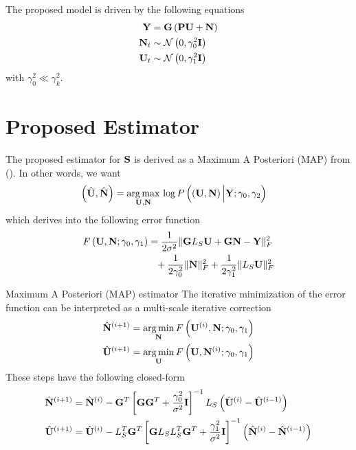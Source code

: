 The proposed model is driven by the following equations
\begin{align}
    \mathbf{Y} &= \mathbf{G} \left( \mathbf{P} \mathbf{U} + \mathbf{N} \right) \\
    \mathbf{N}_t &\sim  
    \mathcal{N}\left( 0, \gamma_0^2 \mathbf{I}  \right) \\
    \mathbf{U}_t &\sim  
    \mathcal{N}\left( 0, \gamma_1^2 \mathbf{I}  \right) 
\end{align}
with $\gamma_0^2 \ll \gamma_k^2$.

\section{Proposed Estimator}

The proposed estimator for $\mathbf{S}$ is derived as a Maximum A Posteriori (MAP) from ().
%
In other words, we want
\begin{align}
    \left(  \hat{\mathbf{U}}, \hat{\mathbf{N}}  \right) &=
    \operatorname*{arg\,max}_{\mathbf{U}, \mathbf{N} }\,
    \log P\left( \left(  {\mathbf{U}}, {\mathbf{N}}  \right) \Big| {\mathbf{Y}; \gamma_0, \gamma_2}  \right)
\end{align}
which derives into the following error function
\begin{align}
    F\left(  {\mathbf{U}}, {\mathbf{N}};  \gamma_0, \gamma_1 \right) &=
    \frac{1}{2\sigma^2}
    \lVert \mathbf{G} L_S \mathbf{U} + \mathbf{G} \mathbf{N} - \mathbf{Y} \rVert_F^2
    \nonumber \\
    &\phantom{=}
    +
    \frac{1}{2\gamma_0^2} \lVert \mathbf{N} \rVert_F^2
    +
    \frac{1}{2\gamma_1^2} \lVert L_S \mathbf{U} \rVert_F^2
\end{align}
 


 {Maximum A Posteriori (MAP) estimator}
    The iterative minimization of the error function can be interpreted as a multi-scale iterative correction
    \begin{align}
        \hat{\mathbf{N}}^{(i+1)} &= \operatorname*{arg\,min}_{\mathbf{N}} F\left( \mathbf{U}^{(i)},\mathbf{N}; \gamma_0, \gamma_1 \right)
        \\
        \hat{\mathbf{U}}^{(i+1)} &= \operatorname*{arg\,min}_{\mathbf{U}} F\left( \mathbf{U},\mathbf{N}^{(i)}; \gamma_0, \gamma_1 \right)
    \end{align}
    These steps have the following closed-form
    \begin{align}
        \hat{\mathbf{N}}^{(i+1)} &=
        \hat{\mathbf{N}}^{(i)}
        -
        \mathbf{G}^T \left[ \mathbf{G} \mathbf{G}^T + \frac{\gamma_0^2}{\sigma^2} \mathbf{I} \right]^{-1} L_S \left( \hat{\mathbf{U}}^{(i)}-\hat{\mathbf{U}}^{(i-1)}  \right)
        \\
        \hat{\mathbf{U}}^{(i+1)} &=
        \hat{\mathbf{U}}^{(i)}
        -
        L_S^T \mathbf{G}^T \left[ \mathbf{G} L_S L_S^T \mathbf{G}^T + \frac{\gamma_1^2}{\sigma^2} \mathbf{I} \right]^{-1} \left( \hat{\mathbf{N}}^{(i)}-\hat{\mathbf{N}}^{(i-1)}  \right)
    \end{align}

